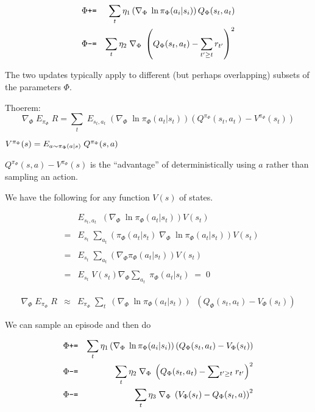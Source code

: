 {\begin{eqnarray*}
  \Phi  &\mbox{\tt +=} & \sum_t \eta_1\left(\nabla_{\Phi}\;\ln \pi_{\Phi}(a_i|s_i)\right)Q_\Phi(s_t,a_t)\\
  \Phi & \mbox{\tt -=} & \sum_t \eta_2 \;\nabla_{\Phi}\;\left(Q_\Phi(s_t,a_t) - \sum_{t' \geq t} r_{t'}\right)^2
\end{eqnarray*}

The two updates typically apply to different (but perhaps overlapping) subsets of the parameters $\Phi$.


Thoerem:
$$\nabla_\Phi \;E_{\pi_\Phi}\; R = \sum_t\;E_{s_t,a_t} \; \left(\nabla_\Phi \;\ln \pi_\Phi(a_t|s_t)\right)(Q^{\pi_\Phi}(s_t,a_t) - V^{\pi_\Phi}(s_t))$$

\vfill
$V^{\pi_\Phi}(s) = E_{a \sim \pi_\Phi(a|s)}\;Q^{\pi_\Phi}(s,a)$

\vfill
$Q^{\pi_\Phi}(s,a) - V^{\pi_\Phi}(s)$ is the ``advantage'' of deterministically using $a$ rather than sampling an action.


We have the following for any function $V(s)$ of states.

\begin{eqnarray*}
 & & E_{s_t,a_t} \;  \; \left(\nabla_\Phi \;\ln \pi_\Phi(a_t|s_t)\right) V(s_t) \\
 \\
 & = & E_{s_t} \;  \sum_{a_t} \left(\pi_\Phi(a_t|s_t) \;\nabla_\Phi \;\ln \pi_\Phi(a_t|s_t)\right) V(s_t) \\
 \\
 & = & E_{s_t} \;  \sum_{a_t} \left(\nabla_\Phi \pi_\Phi(a_t|s_t)\right) V(s_t) \\
 \\
 & = & E_{s_t} \;  V(s_t) \nabla_\Phi \sum_{a_t}\; \pi_\Phi(a_t|s_t) \;=\; 0
\end{eqnarray*}

\begin{eqnarray*}
  \nabla_\Phi \;E_{\pi_\Phi}\;R   & \approx & E_{\pi_\Phi} \; \sum_t\; \left(\nabla_\Phi \;\ln \pi_\Phi(a_t|s_t)\right) \;\;(Q_\Phi(s_t,a_t) - V_\Phi(s_t))
\end{eqnarray*}

We can sample an episode and then do

\begin{eqnarray*}
  \Phi  &\mbox{\tt +=} & \sum_t \eta_1\left(\nabla_{\Phi}\;\ln \pi_{\Phi}(a_i|s_i)\right)(Q_\Phi(s_t,a_t) - V_\Phi(s_t))\\
  \Phi & \mbox{\tt -=} & \sum_t \eta_2 \;\nabla_{\Phi}\;\left(Q_\Phi(s_t,a_t) - \sum \!_{t' \geq t}\; r_{t'}\right)^2 \\
  \Phi & \mbox{\tt -=} & \sum_t \eta_3 \;\nabla_{\Phi}\;\left(V_\Phi(s_t) - Q_\Phi(s_t,a)\right)^2 \\
\end{eqnarray*}


}

